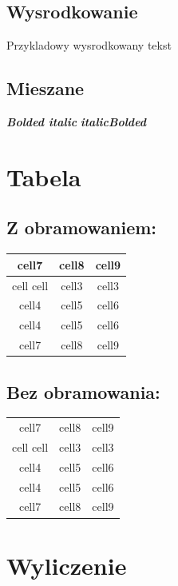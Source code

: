 \documentclass{report}
\begin{document}
        \subsection{Wysrodkowanie}
            \centerline{Przykladowy wysrodkowany tekst}

        \subsection{Mieszane}
            \textbf{\textit{Bolded italic}}
            \newline
            \textit{\textbf{italicBolded}}

    \section{Tabela}
        \subsection{Z obramowaniem:}
            \begin{tabular}{| c | c | c |}
                \hline
                cell7 & cell8 & cell9\\
                \hline
                cell cell & cell3 & cell3 \\
                \hline
                cell4 & cell5 & cell6 \\
                \hline
                cell4 & cell5 & cell6 \\
                \hline
                cell7 & cell8 & cell9
            \end{tabular}

        \subsection{Bez obramowania:}
            \begin{tabular}{c c c}
                cell7 & cell8 & cell9\\
                cell cell & cell3 & cell3 \\
                cell4 & cell5 & cell6 \\
                cell4 & cell5 & cell6 \\
                cell7 & cell8 & cell9  
            \end{tabular}

    \section{Wyliczenie}
\end{document}
